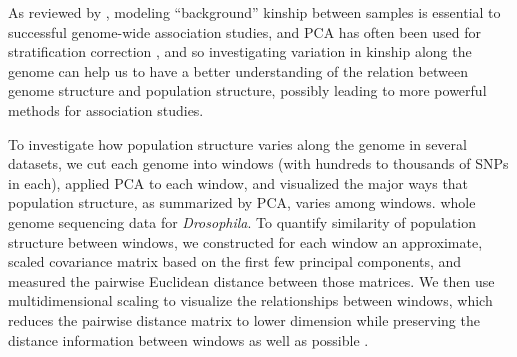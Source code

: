 \documentclass[11pt, oneside]{article}   	%
\begin{document}
As reviewed by \citet{astle2009population}, 
modeling ``background'' kinship between samples
is essential to successful genome-wide association studies,
and PCA has often been used for stratification correction \citep{price2006principal},
and so investigating variation in kinship along the genome can help us to have a
better understanding of the relation between genome structure 
and population structure, possibly leading to more powerful methods for association studies.

To investigate how population structure varies along the genome in several datasets, 
we cut each genome into windows (with hundreds to thousands of SNPs in each), 
applied PCA to each window, 
and visualized the major ways that population structure, as summarized by PCA, varies among windows.
whole genome sequencing data for \textit{Drosophila}.  
To quantify similarity of population structure between
windows, we constructed for each window an approximate, scaled covariance
matrix based on the first few principal components, and measured the pairwise Euclidean distance
between those matrices.  
We then use multidimensional scaling to visualize the
relationships between windows, which reduces the pairwise distance matrix to
lower dimension while preserving the distance information between windows as
well as possible \citep{borg2005modern}.  
\end{document}
